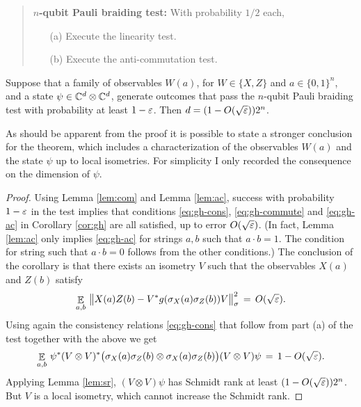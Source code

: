 \begin{quote}
\textbf{$n$-qubit Pauli braiding test:}
With probability $1/2$ each, 
\begin{itemize}
\item[(a)] Execute the linearity test.
\item[(b)] Execute the anti-commutation test.
\end{itemize}
\end{quote}

\begin{theorem}
Suppose that a family of observables $W(a)$, for $W\in\{X,Z\}$ and $a\in\{0,1\}^n$, and a state $\psi\in\mathbb{C}^d\otimes \mathbb{C}^d$, generate outcomes that pass the $n$-qubit Pauli braiding test with probability at least $1-\varepsilon$. Then $d= (1-O(\sqrt{\varepsilon}))2^n$.
\end{theorem}

As should be apparent from the proof it is possible to state a stronger conclusion for the theorem, which includes a characterization of the observables $W(a)$ and the state $\psi$ up to local isometries. For simplicity I only recorded the consequence on the dimension of $\psi$. 

\begin{proof}
Using Lemma \ref{lem:com} and Lemma \ref{lem:ac}, success with probability $1-\varepsilon$ in the test implies that conditions \eqref{eq:gh-cons}, \eqref{eq:gh-commute} and \eqref{eq:gh-ac} in Corollary \ref{cor:gh} are all satisfied, up to error $O(\sqrt{\varepsilon})$. (In fact, Lemma \ref{lem:ac} only implies \eqref{eq:gh-ac} for strings $a,b$ such that $a\cdot b=1$. The condition for string such that $a\cdot b=0$ follows from the other conditions.) The conclusion of the corollary is that there exists an isometry $V$ such that the observables $X(a)$ and $Z(b)$ satisfy 
$$\mathop{\mathbb{E}}\displaylimits_{a,b}\, \big\| X(a)Z(b) - V^*g(\sigma_X(a)\sigma_Z(b))V \big\|_\sigma^2 \,=\, O(\sqrt{\varepsilon}).$$
Using again the consistency relations \eqref{eq:gh-cons} that follow from part (a) of the  test together with the above we get
$$\mathop{\mathbb{E}}\displaylimits_{a,b}\, \psi^* (V\otimes V)^* \big(  \sigma_X(a)\sigma_Z(b)\otimes  \sigma_X(a)\sigma_Z(b)\big)(V\otimes V)\psi \,=\, 1-O(\sqrt{\varepsilon}).$$
Applying Lemma \ref{lem:sr}, $(V\otimes V)\psi$ has Schmidt rank at least $(1-O(\sqrt{\varepsilon}))2^n$. But $V$ is a local isometry, which cannot increase the Schmidt rank. 
\end{proof}






